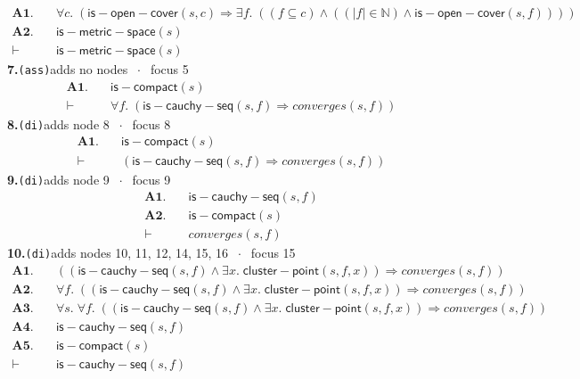 \documentclass[11pt]{article}
\begin{document}
\begin{align*}
  \mathbf{A1.}\quad & \forall c.\; (\mathsf{is{-}open{-}cover}(s, c) \Rightarrow \exists f.\; ((f \subseteq c) \wedge ((|f| \in \mathbb{N}) \wedge \mathsf{is{-}open{-}cover}(s, f)))) \\
  \mathbf{A2.}\quad & \mathsf{is{-}metric{-}space}(s) \\
  \vdash\quad & \mathsf{is{-}metric{-}space}(s)
\end{align*}
\medskip\noindent\textbf{7.}\quad \texttt{(ass)}\hfill{\small adds no nodes $\;\cdot\;$ focus 5}\\[2pt]
\begin{align*}
  \mathbf{A1.}\quad & \mathsf{is{-}compact}(s) \\
  \vdash\quad & \forall f.\; (\mathsf{is{-}cauchy{-}seq}(s, f) \Rightarrow \mathit{converges}(s, f))
\end{align*}
\medskip\noindent\textbf{8.}\quad \texttt{(di)}\hfill{\small adds node 8 $\;\cdot\;$ focus 8}\\[2pt]
\begin{align*}
  \mathbf{A1.}\quad & \mathsf{is{-}compact}(s) \\
  \vdash\quad & (\mathsf{is{-}cauchy{-}seq}(s, f) \Rightarrow \mathit{converges}(s, f))
\end{align*}
\medskip\noindent\textbf{9.}\quad \texttt{(di)}\hfill{\small adds node 9 $\;\cdot\;$ focus 9}\\[2pt]
\begin{align*}
  \mathbf{A1.}\quad & \mathsf{is{-}cauchy{-}seq}(s, f) \\
  \mathbf{A2.}\quad & \mathsf{is{-}compact}(s) \\
  \vdash\quad & \mathit{converges}(s, f)
\end{align*}
\medskip\noindent\textbf{10.}\quad \texttt{(di)}\hfill{\small adds nodes 10, 11, 12, 14, 15, 16 $\;\cdot\;$ focus 15}\\[2pt]
\begin{align*}
  \mathbf{A1.}\quad & ((\mathsf{is{-}cauchy{-}seq}(s, f) \wedge \exists x.\; \mathsf{cluster{-}point}(s, f, x)) \Rightarrow \mathit{converges}(s, f)) \\
  \mathbf{A2.}\quad & \forall f.\; ((\mathsf{is{-}cauchy{-}seq}(s, f) \wedge \exists x.\; \mathsf{cluster{-}point}(s, f, x)) \Rightarrow \mathit{converges}(s, f)) \\
  \mathbf{A3.}\quad & \forall s.\; \forall f.\; ((\mathsf{is{-}cauchy{-}seq}(s, f) \wedge \exists x.\; \mathsf{cluster{-}point}(s, f, x)) \Rightarrow \mathit{converges}(s, f)) \\
  \mathbf{A4.}\quad & \mathsf{is{-}cauchy{-}seq}(s, f) \\
  \mathbf{A5.}\quad & \mathsf{is{-}compact}(s) \\
  \vdash\quad & \mathsf{is{-}cauchy{-}seq}(s, f)
\end{align*}
\end{document}
